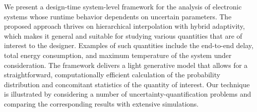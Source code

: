 We present a design-time system-level framework for the analysis of electronic
systems whose runtime behavior dependents on uncertain parameters. The proposed
approach thrives on hierarchical interpolation with hybrid adaptivity, which
makes it general and suitable for studying various quantities that are of
interest to the designer. Examples of such quantities include the end-to-end
delay, total energy consumption, and maximum temperature of the system under
consideration. The framework delivers a light generative model that allows for a
straightforward, computationally efficient calculation of the probability
distribution and concomitant statistics of the quantity of interest. Our
technique is illustrated by considering a number of uncertainty-quantification
problems and comparing the corresponding results with extensive simulations.
